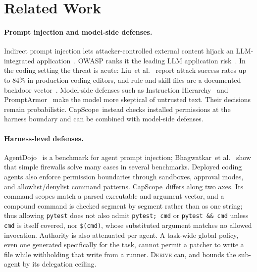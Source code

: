 \documentclass[sigplan,review,anonymous]{acmart}
\newcommand{\tool}{CapScope\xspace}
\newcommand{\etal}{et al.\xspace}
\newcommand{\rulename}[1]{\textsc{#1}}
\begin{document}
  \section{Related Work}
  \label{sec:related}

  \paragraph{Prompt injection and model-side defenses.}
  Indirect prompt injection lets attacker-controlled external content hijack an
  LLM-integrated application~\cite{greshake2023not}. OWASP ranks it the leading LLM
  application risk~\cite{owasp2025llm01}. In the coding setting the threat
  is acute: Liu~\etal~\cite{liu2025youraishell} report attack success
  rates up to 84\% in production coding editors, and rule and skill files
  are a documented backdoor vector~\cite{pillar2025rules}. Model-side
  defenses such as Instruction Hierarchy~\cite{wallace2024instructionhierarchy}
  and PromptArmor~\cite{shi2025promptarmor} make the model more skeptical
  of untrusted text. Their decisions remain probabilistic. \tool\ instead
  checks installed permissions at the harness boundary and can be combined
  with model-side defenses.

  \paragraph{Harness-level defenses.}
  AgentDojo~\cite{debenedetti2024agentdojo} is a benchmark for agent prompt
  injection; Bhagwatkar~\etal~\cite{bhagwatkar2025firewalls} show that simple
  firewalls solve many cases in several benchmarks. Deployed coding agents also
  enforce permission boundaries through sandboxes, approval modes, and allowlist/denylist
  command patterns. \tool\ differs along two axes. Its command scopes match a
  parsed executable and argument vector, and a compound command is checked
  segment by segment rather than as one string; thus allowing \texttt{pytest}
  does not also admit \texttt{pytest; cmd} or \texttt{pytest \&\& cmd} unless
  \texttt{cmd} is itself covered, nor \texttt{\$(cmd)}, whose substituted
  argument matches no allowed invocation. Authority is also attenuated per
  agent.
  A task-wide global policy, even one generated specifically for the task,
  cannot permit a patcher to write a file while withholding that write from a
  runner. \rulename{Derive} can, and bounds the sub-agent by its delegation
  ceiling.
\end{document}
